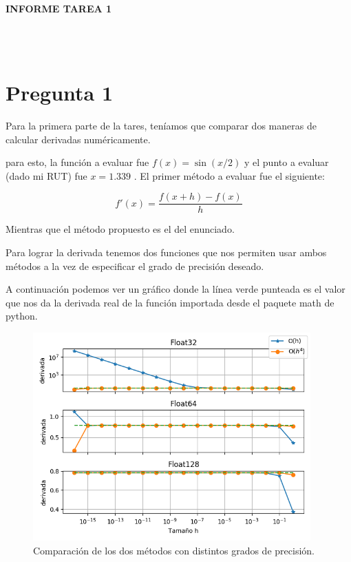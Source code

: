 \documentclass[letter, 11pt]{article}
\begin{document}
\thispagestyle{firstpage}

\begin{center}
  {\uppercase{\LARGE \bf Informe Tarea 1}}
\end{center}

\\
\\


\section{Pregunta 1}
Para la primera parte de la tares, teníamos que comparar dos maneras de
calcular derivadas numéricamente.

para esto, la función a evaluar fue $f(x)=\sin(x/2)$ y el punto a evaluar
(dado mi RUT) fue $x=1.339$ . El primer método a evaluar fue el siguiente:

\begin{equation}
  f'(x)=\frac{f(x+h)-f(x)}{h}
\end{equation}

Mientras que el método propuesto es el del enunciado.

Para lograr la derivada tenemos dos funciones que nos permiten usar ambos métodos
a la vez de especificar el grado de precisión deseado.


A continuación podemos ver un gráfico donde la línea verde punteada es
el valor que nos da la derivada real de la función importada desde el paquete
math de python.

\begin{figure}[!ht]
  \centering
  \includegraphics[height=8cm]{P1.png}
  \caption{Comparación de los dos métodos con distintos grados de precisión.}
\end{figure}
\end{document}

